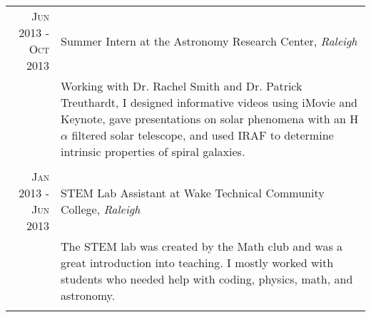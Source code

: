 \documentclass[a4paper,10pt]{article} %
\begin{document}
\begin{tabular}{r|p{11cm}}
\textsc{Jun 2013 - Oct 2013} & Summer Intern at the Astronomy Research Center, \emph{Raleigh}\\
& \footnotesize{Working with Dr. Rachel Smith and Dr. Patrick Treuthardt, I designed informative videos using iMovie and Keynote, gave presentations on solar phenomena with an H$\alpha$ filtered solar telescope, and used IRAF to determine intrinsic properties of spiral galaxies.}\\
\multicolumn{2}{c}{} \\


\textsc{Jan 2013 - Jun 2013} & STEM Lab Assistant at Wake Technical Community College, \emph{Raleigh}\\
& \footnotesize{The STEM lab was created by the Math club and was a great introduction into teaching. I mostly worked with students who needed help with coding, physics, math, and astronomy.}\\
\multicolumn{2}{c}{} \\


\end{tabular}
\bigskip
\end{document}
